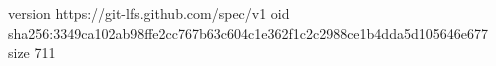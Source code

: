 version https://git-lfs.github.com/spec/v1
oid sha256:3349ca102ab98ffe2cc767b63c604c1e362f1c2c2988ce1b4dda5d105646e677
size 711

